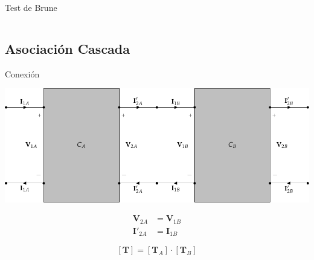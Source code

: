 \documentclass[xcolor={usenames,svgnames,dvipsnames}]{beamer}
\begin{document}
\begin{frame}[label={sec:org75273b2},plain]{Test de Brune}
\begin{columns}
\begin{column}{0.65\columnwidth}
\begin{center}
\end{center}
\end{column}
\end{columns}
\end{frame}
\subsection{Asociación Cascada}
\label{sec:orgf91c588}

\begin{frame}[label={sec:orgef71508}]{Conexión}
\begin{center}
\includegraphics[width=.9\linewidth]{figs/cascada.pdf}
\end{center}

\begin{align*}
  \mathbf{V}_{2A} &= \mathbf{V}_{1B}\\
  \mathbf{I}'_{2A} &= \mathbf{I}_{1B}
\end{align*}


\[
  \boxed{[\mathbf{T}] = [\mathbf{T}_A] \cdot [\mathbf{T}_B]}
\]
\end{frame}
\end{document}

